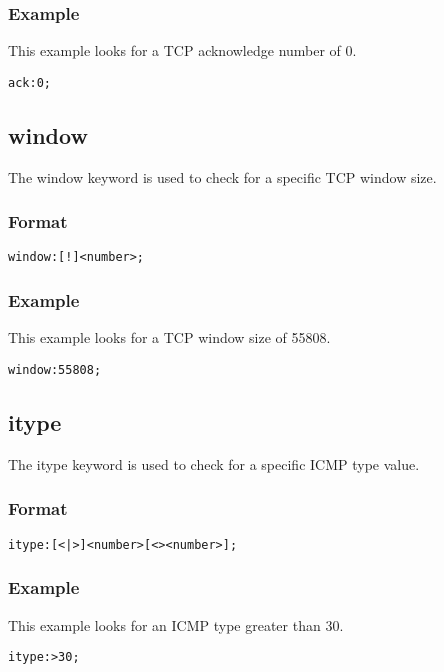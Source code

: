 \documentclass[english]{report}
\begin{document}
\subsubsection{Example}
This example looks for a TCP acknowledge number of 0.
\begin{verbatim}
ack:0;
\end{verbatim}

\subsection{window}

The window keyword is used to check for a specific TCP window size.

\subsubsection{Format}

\begin{verbatim}
window:[!]<number>;
\end{verbatim}

\subsubsection{Example}
This example looks for a TCP window size of 55808.
\begin{verbatim}
window:55808;
\end{verbatim}

\subsection{itype}

The itype keyword is used to check for a specific ICMP type value.

\subsubsection{Format}

\begin{verbatim}
itype:[<|>]<number>[<><number>];
\end{verbatim}

\subsubsection{Example}

This example looks for an ICMP type greater than 30.
\begin{verbatim}
itype:>30;
\end{verbatim}
\end{document}
